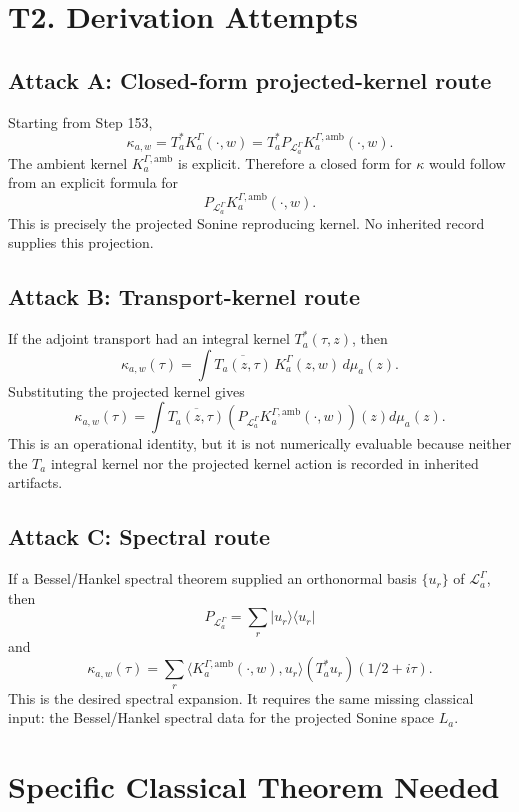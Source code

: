 \documentclass[11pt]{article}
\newcommand{\Kamb}{K_a^{\Gamma,\mathrm{amb}}}
\begin{document}
\section{T2. Derivation Attempts}

\subsection*{Attack A: Closed-form projected-kernel route}

Starting from Step 153,
\[
\kappa_{a,w}
=
T_a^*K_a^\Gamma(\cdot,w)
=
T_a^*P_{\mathcal L_a^\Gamma}\Kamb(\cdot,w).
\]
The ambient kernel \(\Kamb\) is explicit.  Therefore a closed form for
\(\kappa\) would follow from an explicit formula for
\[
P_{\mathcal L_a^\Gamma}\Kamb(\cdot,w).
\]
This is precisely the projected Sonine reproducing kernel.  No inherited
record supplies this projection.

\subsection*{Attack B: Transport-kernel route}

If the adjoint transport had an integral kernel \(T_a^*(\tau,z)\), then
\[
\boxed{
\kappa_{a,w}(\tau)
=
\int \overline{T_a(z,\tau)}\,K_a^\Gamma(z,w)\,d\mu_a(z).
}
\]
Substituting the projected kernel gives
\[
\kappa_{a,w}(\tau)
=
\int \overline{T_a(z,\tau)}
\left(P_{\mathcal L_a^\Gamma}\Kamb(\cdot,w)\right)(z)
d\mu_a(z).
\]
This is an operational identity, but it is not numerically evaluable because
neither the \(T_a\) integral kernel nor the projected kernel action is recorded
in inherited artifacts.

\subsection*{Attack C: Spectral route}

If a Bessel/Hankel spectral theorem supplied an orthonormal basis
\(\{u_r\}\) of \(\mathcal L_a^\Gamma\), then
\[
P_{\mathcal L_a^\Gamma}
=
\sum_r |u_r\rangle\langle u_r|
\]
and
\[
\boxed{
\kappa_{a,w}(\tau)
=
\sum_r
\langle \Kamb(\cdot,w),u_r\rangle
(T_a^*u_r)(1/2+i\tau).
}
\]
This is the desired spectral expansion.  It requires the same missing
classical input: the Bessel/Hankel spectral data for the projected Sonine
space \(L_a\).

\section{Specific Classical Theorem Needed}
\end{document}
